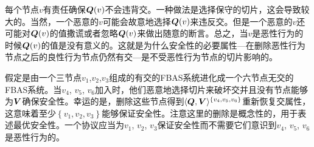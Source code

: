每个节点$v$有责任确保${\bm Q}(v)$不会违背{\quorum}交。一种做法是选择保守的切片，这会导致较大的{\quorum}。当然，一个恶意的$v$可能会故意地选择${\bm Q}(v)$来违反{\quorum}交。但是一个恶意的$v$还可能对${\bm Q}(v)$的值撒谎或者忽略${\bm Q}(v)$来做出随意的断言。总之，当$v$是恶性行为的时候${\bm Q}(v)$的值是没有意义的。这就是为什么安全性的必要属性---在删除恶性行为节点之后的良性行为节点仍然有{\quorum}交---是不受恶性行为节点的切片影响的。

假定是由一个三节点$v_1$,$v_2$,$v_3$组成的有{\quorum}交的FBAS系统进化成一个六节点无{\quorum}交的FBAS系统。当$v_4$, $v_5$, $v_6$加入时，他们恶意地选择切片来破坏{\quorum}交并且没有节点能够为${\bm V}$确保安全性。幸运的是，删除这些节点得到$\langle{\bm Q},{\bm V}\rangle^{\left\{v_4,v_5,v_6\right\}}$重新恢复{\quorum}交属性，这意味着至少$\left\{v_1,v_2,v_3\right\}$能够保证安全性。注意这里的删除是概念性的，用于表述最优安全性。一个协议应当为$v_1$, $v_2$, $v_3$保证安全性而不需要它们意识到$v_4$, $v_5$, $v_6$是恶性行为的。